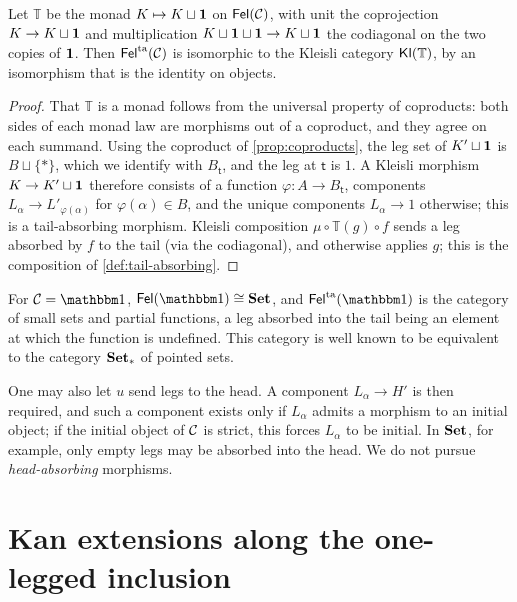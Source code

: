 \begin{proposition}\label{prop:kleisli}
Let $\mathbb T$ be the monad $K\mapsto K\sqcup\mathbf{1}$ on $\mathsf{Fel}(\mathcal{C})$, with unit
the coprojection $K\to K\sqcup\mathbf{1}$ and multiplication
$K\sqcup\mathbf{1}\sqcup\mathbf{1}\to K\sqcup\mathbf{1}$ the codiagonal on the two copies
of $\mathbf{1}$. Then $\mathsf{Fel}^{\mathrm{ta}}(\mathcal{C})$ is isomorphic to the Kleisli category
$\mathsf{Kl}(\mathbb T)$, by an isomorphism that is the identity on objects.
\end{proposition}

\begin{proof}
That $\mathbb T$ is a monad follows from the universal property of
coproducts: both sides of each monad law are morphisms out of a coproduct, and
they agree on each summand. Using the coproduct of \cref{prop:coproducts}, the leg set
of $K'\sqcup\mathbf{1}$ is $B\sqcup\{*\}$, which we identify with $B_{\mathsf t}$,
and the leg at $\mathsf t$ is $1$. A Kleisli morphism $K\to K'\sqcup\mathbf{1}$
therefore consists of a function $\varphi\colon A\to B_{\mathsf t}$, components
$L_\alpha\to L'_{\varphi(\alpha)}$ for $\varphi(\alpha)\in B$, and the unique
components $L_\alpha\to1$ otherwise; this is a tail-absorbing morphism. Kleisli
composition $\mu\circ\mathbb T(g)\circ f$ sends a leg absorbed by $f$ to the
tail (via the codiagonal), and otherwise applies $g$; this is the composition
of \cref{def:tail-absorbing}.
\end{proof}

\begin{example}\label{ex:partial}
For $\cC=\one$, $\Fel(\one)\iso\Set$, and $\Fel^{\ta}(\one)$ is the category of
small sets and partial functions, a leg absorbed into the tail being an
element at which the function is undefined. This category is well known to be
equivalent to the category $\mathbf{Set}_{*}$ of pointed sets.
\end{example}

\begin{remark}\label{rem:head-absorbing}
One may also let $u$ send legs to the head. A component $L_\alpha\to H'$ is then
required, and such a component exists only if $L_\alpha$ admits a morphism to
an initial object; if the initial object of $\mathcal{C}$ is strict, this forces
$L_\alpha$ to be initial. In $\mathbf{Set}$, for example, only empty legs may be absorbed
into the head. We do not pursue \emph{head-absorbing} morphisms.
\end{remark}

\section{Kan extensions along the one-legged inclusion}\label{sec:kan}

